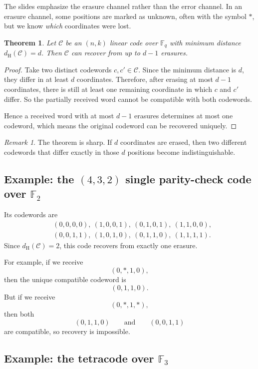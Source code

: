 \documentclass[11pt]{article}
\newtheorem{theorem}[proposition]{Theorem}
\theoremstyle{definition}
\theoremstyle{remark}
\newtheorem*{remark}{Remark}
\newcommand{\F}{\mathbb{F}}
\newcommand{\code}{\mathcal{C}}
\newcommand{\dH}{d_{\mathrm H}}
\begin{document}
The slides emphasize the erasure channel rather than the error channel. In an erasure channel, some positions are marked as unknown, often with the symbol $*$, but we know \emph{which} coordinates were lost.

\begin{theorem}
Let $\code$ be an $(n,k)$ linear code over $\F_q$ with minimum distance $\dH(\code)=d$. Then $\code$ can recover from up to $d-1$ erasures.
\end{theorem}

\begin{proof}
Take two distinct codewords $c,c'\in\code$. Since the minimum distance is $d$, they differ in at least $d$ coordinates. Therefore, after erasing at most $d-1$ coordinates, there is still at least one remaining coordinate in which $c$ and $c'$ differ. So the partially received word cannot be compatible with both codewords.

Hence a received word with at most $d-1$ erasures determines at most one codeword, which means the original codeword can be recovered uniquely.
\end{proof}

\begin{remark}
The theorem is sharp. If $d$ coordinates are erased, then two different codewords that differ exactly in those $d$ positions become indistinguishable.
\end{remark}

\subsection{\texorpdfstring{Example: the $(4,3,2)$ single parity-check code over $\F_2$}{Example: the (4,3,2) single parity-check code over F2}}

Its codewords are
\[
\begin{aligned}
&(0,0,0,0),\ (1,0,0,1),\ (0,1,0,1),\ (1,1,0,0),\\
&(0,0,1,1),\ (1,0,1,0),\ (0,1,1,0),\ (1,1,1,1).
\end{aligned}
\]
Since $\dH(\code)=2$, this code recovers from exactly one erasure.

For example, if we receive
\[
(0,*,1,0),
\]
then the unique compatible codeword is
\[
(0,1,1,0).
\]
But if we receive
\[
(0,*,1,*),
\]
then both
\[
(0,1,1,0)\qquad\text{and}\qquad (0,0,1,1)
\]
are compatible, so recovery is impossible.

\subsection{\texorpdfstring{Example: the tetracode over $\F_3$}{Example: the tetracode over F3}}
\end{document}
